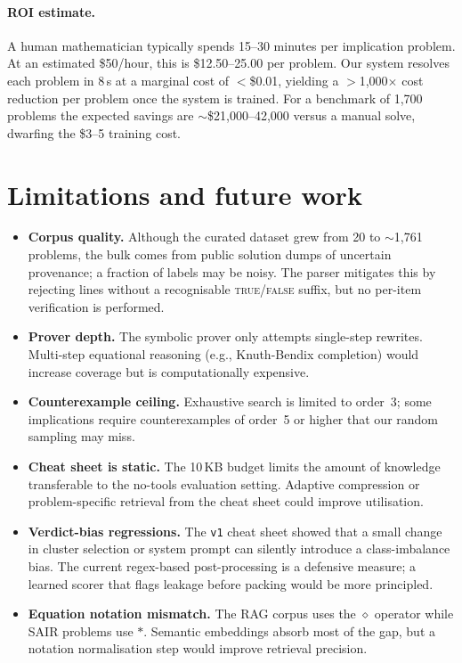 \documentclass{article}
\begin{document}
\paragraph{ROI estimate.} A human mathematician typically spends 15--30 minutes per implication problem. At an estimated \$50/hour, this is \$12.50--25.00 per problem. Our system resolves each problem in 8\,s at a marginal cost of $<$\$0.01, yielding a $>$1{,}000$\times$ cost reduction per problem once the system is trained. For a benchmark of 1{,}700 problems the expected savings are $\sim$\$21{,}000--42{,}000 versus a manual solve, dwarfing the \$3--5 training cost.

\section{Limitations and future work}
\label{sec:limitations}

\begin{itemize}[itemsep=2pt]
  \item \textbf{Corpus quality.} Although the curated dataset grew from 20 to $\sim$1{,}761 problems, the bulk comes from public solution dumps of uncertain provenance; a fraction of labels may be noisy. The parser mitigates this by rejecting lines without a recognisable \textsc{true}/\textsc{false} suffix, but no per-item verification is performed.
  \item \textbf{Prover depth.} The symbolic prover only attempts single-step rewrites. Multi-step equational reasoning (e.g., Knuth-Bendix completion) would increase coverage but is computationally expensive.
  \item \textbf{Counterexample ceiling.} Exhaustive search is limited to order~3; some implications require counterexamples of order~5 or higher that our random sampling may miss.
  \item \textbf{Cheat sheet is static.} The 10\,KB budget limits the amount of knowledge transferable to the no-tools evaluation setting. Adaptive compression or problem-specific retrieval from the cheat sheet could improve utilisation.
  \item \textbf{Verdict-bias regressions.} The \texttt{v1} cheat sheet showed that a small change in cluster selection or system prompt can silently introduce a class-imbalance bias. The current regex-based post-processing is a defensive measure; a learned scorer that flags leakage before packing would be more principled.
  \item \textbf{Equation notation mismatch.} The RAG corpus uses the $\diamond$ operator while SAIR problems use $*$. Semantic embeddings absorb most of the gap, but a notation normalisation step would improve retrieval precision.
\end{itemize}
\end{document}
